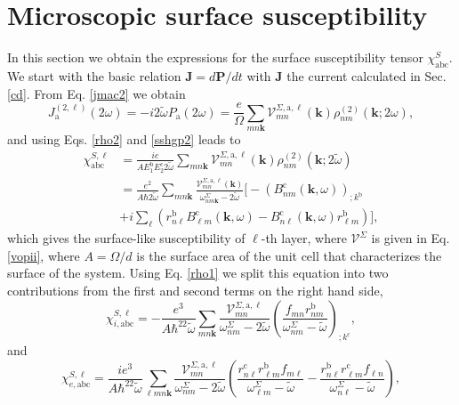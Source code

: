 \section{Microscopic surface susceptibility}
In this section we obtain the expressions for the 
surface susceptibility tensor $\chi^S_{\mathrm{abc}}$.
We start with the basic relation $\mathbf{J} = d\mathbf{P}/dt$ 
with $\mathbf{J}$ the current calculated in Sec. \ref{cd}. From Eq. \eqref{jmac2} 
we obtain
\begin{equation}\label{Pjikn}
J_{\mathrm{a}}^{(2,\ell)}(2\omega)=-i2\tilde{\omega} P_{\mathrm{a}}(2\omega)
=\frac{e}{\Omega}
\sum_{mn\mathbf{k}}
\mathcal{V}^{\Sigma,\mathrm{a},\ell}_{mn}(\mathbf{k})
\rho^{(2)}_{nm}(\mathbf{k};2\omega)
,
\end{equation}
and using Eqs. \eqref{rho2} and \eqref{sshgp2} leads to
\begin{align}\label{Pjikn2}
\chi^{S,\ell}_{\mathrm{abc}}
&=
\frac{ie}{A E^{\mathrm{b}}_1E^{\mathrm{c}}_2 2\tilde{\omega}}
\sum_{mn\mathbf{k}}
\mathcal{V}^{\Sigma,\mathrm{a},\ell}_{mn}(\mathbf{k})
\rho^{(2)}_{nm}(\mathbf{k};2\tilde{\omega})
\nonumber \\
&=
\frac{e^2}{A\hbar2\tilde{\omega}}
\sum_{mn\mathbf{k}}
\frac{\mathcal{V}^{\Sigma,\mathrm{a},\ell}_{mn}(\mathbf{k})}
{\omega^\Sigma_{nm\mathbf{k}}-2\tilde{\omega}}
\bigg[
-(B_{nm}^{\mathrm{c}}(\mathbf{k},\omega))_{;k^{\mathrm{b}}}
\nonumber \\
&
+i\sum_\ell\left(r_{n\ell}^{\mathrm{b}}B_{\ell m}^{\mathrm{c}}(\mathbf{k},\omega) -
  B_{n\ell}^{\mathrm{c}}(\mathbf{k},\omega) 
  r_{\ell m}^{\mathrm{b}}\right)
\bigg]
,
\end{align}
which gives the surface-like susceptibility of $\ell$-th layer, where 
$\boldsymbol{\mathcal{V}}^\Sigma$ is given in Eq. \eqref{vopii},
where $A=\Omega/d$ is the surface area of the unit
cell that characterizes the surface of the system.
Using Eq. \eqref{rho1} we
split this equation into
two contributions from the first and second terms on the right hand side,
\begin{equation}\label{chii}
\chi_{i,\mathrm{abc}}^{S,\ell}
=-\frac{e^3}{A\hbar^22\tilde{\omega}}\sum_{mn\mathbf{k}}
\frac{\mathcal{V}_{mn}^{\Sigma,\mathrm{a},\ell}}{\omega^\Sigma_{nm}-2\tilde{\omega}}
\left(\frac{f_{mn}r_{nm}^{\mathrm{b}}}{\omega^\Sigma_{nm}-\tilde{\omega}}\right)_{;k^{\mathrm{c}}},
\end{equation} 
and 
\begin{equation}\label{chie}
\chi_{e,\mathrm{abc}}^{S,\ell}
=\frac{ie^3}{A\hbar^22\tilde{\omega}}\sum_{\ell mn\mathbf{k}}
\frac{\mathcal{V}_{mn}^{\Sigma,\mathrm{a},\ell}}{\omega^\Sigma_{nm}-2\tilde{\omega}}
\left(
\frac{r_{n\ell}^{\mathrm{c}} r_{\ell m}^{\mathrm{b}} 
f_{m\ell}}{\omega^\Sigma_{\ell m}-\tilde{\omega}}
-\frac{r_{n\ell}^{\mathrm{b}} r_{\ell m}^{\mathrm{c}} 
f_{\ell n}}{\omega^\Sigma_{n \ell}-\tilde{\omega}}
\right),
\end{equation} 
